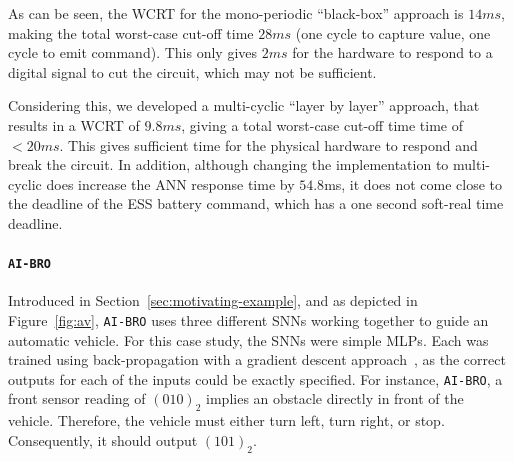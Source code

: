 As can be seen, the \ac{WCRT} for the mono-periodic ``black-box''
approach is $14ms$, 
making the total worst-case cut-off time $28ms$ (one cycle to capture value, one cycle to emit command).
This only gives $2ms$ for the hardware to respond to a digital signal
to cut the circuit, which may not be sufficient.

Considering this, we developed  a multi-cyclic ``layer by layer''
approach, that results in a \ac{WCRT} of $9.8ms$, 
giving a total worst-case cut-off time time of $<20ms$. 
This gives sufficient time for the physical hardware to respond and break the circuit.
In addition, although changing the implementation to multi-cyclic does increase the \ac{ANN} response time by $54.8$ms, it does not
come close to the deadline of the \ac{ESS} battery command, which has a one second soft-real time deadline.

\paragraph{\texttt{AI-BRO}}
Introduced in Section~\ref{sec:motivating-example}, and as depicted in Figure~\ref{fig:av}, \texttt{AI-BRO} uses three different \acp{SNN} working together to guide an automatic vehicle. 
For this case study, the \acp{SNN} were simple \acp{MLP}.
Each was trained using back-propagation with a gradient descent approach~\cite{yegnanarayana1994artificial}, as the correct outputs for each of the inputs could be exactly specified.
For instance, \texttt{AI-BRO}, a front sensor reading of $(010)_2$ implies an obstacle directly in front of the vehicle.
Therefore, the vehicle must either turn left, turn right, or stop.
Consequently, it should output $(101)_2$.


